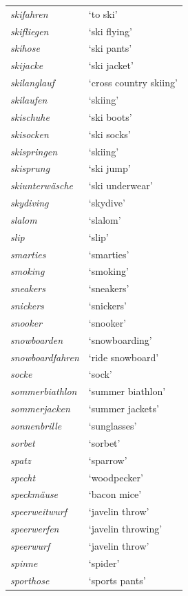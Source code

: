 \begin{longtable}{ll}
\textit{skifahren} & `to ski' \\
\textit{skifliegen} & `ski flying' \\
\textit{skihose} & `ski pants' \\
\textit{skijacke} & `ski jacket' \\
\textit{skilanglauf} & `cross country skiing' \\
\textit{skilaufen} & `skiing' \\
\textit{skischuhe} & `ski boots' \\
\textit{skisocken} & `ski socks' \\
\textit{skispringen} & `skiing' \\
\textit{skisprung} & `ski jump' \\
\textit{skiunterwäsche} & `ski underwear' \\
\textit{skydiving} & `skydive' \\
\textit{slalom} & `slalom' \\
\textit{slip} & `slip' \\
\textit{smarties} & `smarties' \\
\textit{smoking} & `smoking' \\
\textit{sneakers} & `sneakers' \\
\textit{snickers} & `snickers' \\
\textit{snooker} & `snooker' \\
\textit{snowboarden} & `snowboarding' \\
\textit{snowboardfahren} & `ride snowboard' \\
\textit{socke} & `sock' \\
\textit{sommerbiathlon} & `summer biathlon' \\
\textit{sommerjacken} & `summer jackets' \\
\textit{sonnenbrille} & `sunglasses' \\
\textit{sorbet} & `sorbet' \\
\textit{spatz} & `sparrow' \\
\textit{specht} & `woodpecker' \\
\textit{speckmäuse} & `bacon mice' \\
\textit{speerweitwurf} & `javelin throw' \\
\textit{speerwerfen} & `javelin throwing' \\
\textit{speerwurf} & `javelin throw' \\
\textit{spinne} & `spider' \\
\textit{sporthose} & `sports pants' \\

\end{longtable}
